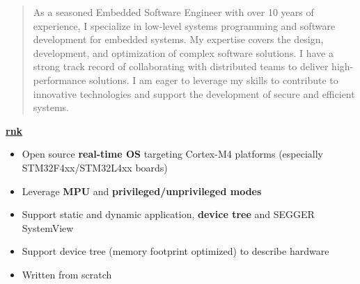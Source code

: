 \documentclass[10pt,a4paper]{altacv}
\begin{document}
\begin{paracol}{2}
\newpage

\switchcolumn

\begin{quote}
{\small As a seasoned Embedded Software Engineer with over 10 years of experience, I specialize in low-level systems programming and software development for embedded systems. My expertise covers the design, development, and optimization of complex software solutions. I have a strong track record of collaborating with distributed teams to deliver high-performance solutions. I am eager to leverage my skills to contribute to innovative technologies and support the development of secure and efficient systems.}
\end{quote}

\bigskip


\bigskip







\newpage

\textbf{\textcolor{accent}{\href{https://github.com/raphui/rnk}{rnk}}}
\begin{itemize}
\item Open source \textbf{\textcolor{bold}{real-time OS}} targeting Cortex-M4 platforms (especially STM32F4xx/STM32L4xx boards)
\item Leverage \textbf{\textcolor{bold}{MPU}} and \textbf{\textcolor{bold}{privileged/unprivileged modes}}
\item Support static and dynamic application, \textbf{\textcolor{bold}{device tree}} and SEGGER SystemView
\item Support device tree (memory footprint optimized) to describe hardware
\item Written from scratch
\end{itemize}


\end{paracol}
\end{document}
